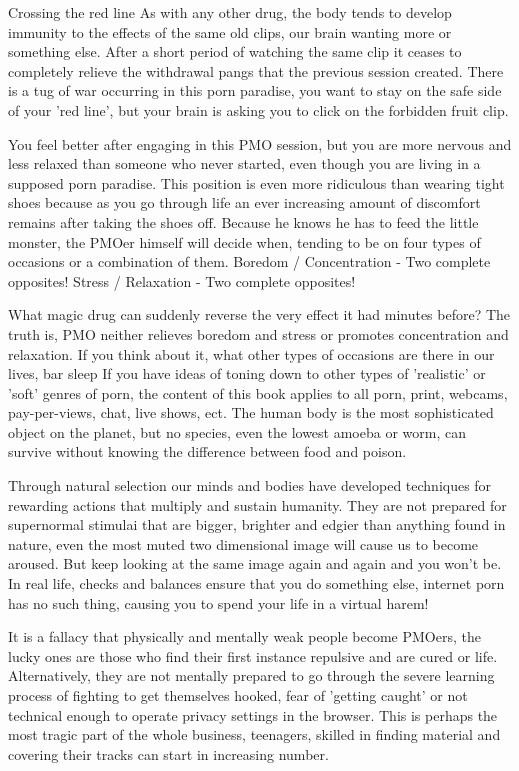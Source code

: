 Crossing the red line
As with any other drug, the body tends to develop immunity to the effects of the same old clips, our brain wanting more or something else. After a short period of watching the same clip it ceases to completely relieve the withdrawal pangs that the previous session created. There is a tug of war occurring in this porn paradise, you want to stay on the safe side of your 'red line', but your brain is asking you to click on the forbidden fruit clip.

You feel better after engaging in this PMO session, but you are more nervous and less relaxed than someone who never started, even though you are living in a supposed porn paradise. This position is even more ridiculous than wearing tight shoes because as you go through life an ever increasing amount of discomfort remains after taking the shoes off. Because he knows he has to feed the little monster, the PMOer himself will decide when, tending to be on four types of occasions or a combination of them.
  Boredom / Concentration - Two complete opposites!
  Stress / Relaxation - Two complete opposites!

What magic drug can suddenly reverse the very effect it had minutes before? The truth is, PMO neither relieves boredom and stress or promotes concentration and relaxation. If you think about it, what other types of occasions are there in our lives, bar sleep If you have ideas of toning down to other types of 'realistic' or 'soft' genres of porn, the content of this book applies to all porn, print, webcams, pay-per-views, chat, live shows, ect. The human body is the most sophisticated object on the planet, but no species, even the lowest amoeba or worm, can survive without knowing the difference between food and poison.

Through natural selection our minds and bodies have developed techniques for rewarding actions that multiply and sustain humanity. They are not prepared for supernormal stimulai that are bigger, brighter and edgier than anything found in nature, even the most muted two dimensional image will cause us to become aroused. But keep looking at the same image again and again and you won't be. In real life, checks and balances ensure that you do something else, internet porn has no such thing, causing you to spend your life in a virtual harem!

It is a fallacy that physically and mentally weak people become PMOers, the lucky ones are those who find their first instance repulsive and are cured or life. Alternatively, they are not mentally prepared to go through the severe learning process of fighting to get themselves hooked, fear of 'getting caught' or not technical enough to operate privacy settings in the browser. This is perhaps the most tragic part of the whole business, teenagers, skilled in finding material and covering their tracks can start in increasing number.

